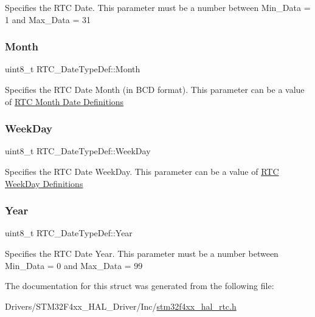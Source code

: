 Specifies the R\+TC Date. This parameter must be a number between Min\+\_\+\+Data = 1 and Max\+\_\+\+Data = 31 \mbox{\label{struct_r_t_c___date_type_def_a3df66a922683acd4db5defe402c664a0}} 
\subsubsection{\texorpdfstring{Month}{Month}}
{\footnotesize\ttfamily uint8\+\_\+t R\+T\+C\+\_\+\+Date\+Type\+Def\+::\+Month}

Specifies the R\+TC Date Month (in B\+CD format). This parameter can be a value of \hyperlink{group___r_t_c___month___date___definitions}{R\+TC Month Date Definitions} \mbox{\label{struct_r_t_c___date_type_def_aff0238fae9aa5fe6dc30ca2833878e45}} 
\subsubsection{\texorpdfstring{Week\+Day}{WeekDay}}
{\footnotesize\ttfamily uint8\+\_\+t R\+T\+C\+\_\+\+Date\+Type\+Def\+::\+Week\+Day}

Specifies the R\+TC Date Week\+Day. This parameter can be a value of \hyperlink{group___r_t_c___week_day___definitions}{R\+TC Week\+Day Definitions} \mbox{\label{struct_r_t_c___date_type_def_a1e7d226d1da13713b7d6bbd18c00bd9b}} 
\subsubsection{\texorpdfstring{Year}{Year}}
{\footnotesize\ttfamily uint8\+\_\+t R\+T\+C\+\_\+\+Date\+Type\+Def\+::\+Year}

Specifies the R\+TC Date Year. This parameter must be a number between Min\+\_\+\+Data = 0 and Max\+\_\+\+Data = 99 

The documentation for this struct was generated from the following file\+:\begin{DoxyCompactItemize}
\item 
Drivers/\+S\+T\+M32\+F4xx\+\_\+\+H\+A\+L\+\_\+\+Driver/\+Inc/\hyperlink{stm32f4xx__hal__rtc_8h}{stm32f4xx\+\_\+hal\+\_\+rtc.\+h}\end{DoxyCompactItemize}
